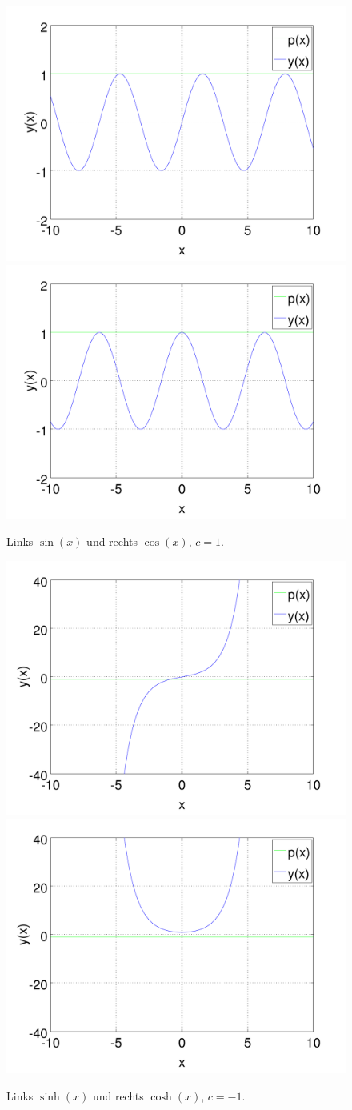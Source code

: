 \begin{figure}
	\includegraphics[width=0.5\hsize]{./wellen/images/basicfunctions/sin.pdf}
	\includegraphics[width=0.5\hsize]{./wellen/images/basicfunctions/cos.pdf}
	\caption{Links $\sin(x)$ und rechts $\cos(x)$, $c = 1$.}
	\label{fig:wellen:sin-cos}
\end{figure}

\begin{figure}
	\includegraphics[width=0.5\hsize]{./wellen/images/basicfunctions/sinh.pdf}
	\includegraphics[width=0.5\hsize]{./wellen/images/basicfunctions/cosh.pdf}
	\caption{Links $\sinh(x)$ und rechts $\cosh(x)$, $c = -1$.}
	\label{fig:wellen:sinh-cosh}
\end{figure}